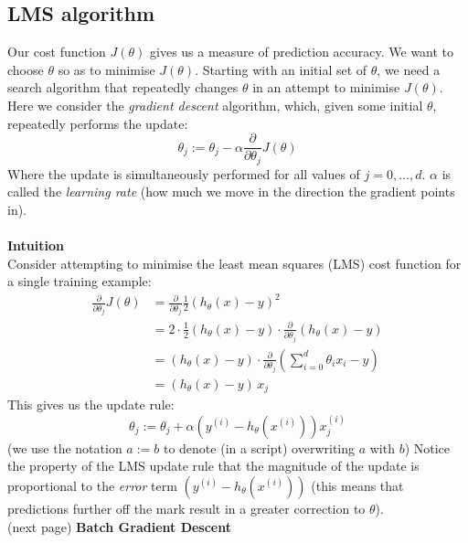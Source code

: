 \documentclass{report}
\begin{document}
\subsection{LMS algorithm}
Our cost function $J(\theta)$ gives us a measure of prediction accuracy. We want to choose $\theta$ so as to
minimise $J(\theta)$. Starting with an initial set of $\theta$, we need a search algorithm that
repeatedly changes $\theta$ in an attempt to minimise $J(\theta)$. Here we consider the \textit{gradient descent}
algorithm, which, given some initial $\theta$, repeatedly performs the update:
\begin{equation*}
\theta_j:=\theta_j-\alpha\frac{\partial}{\partial\theta_j}J(\theta)
\end{equation*}
Where the update is simultaneously performed for all values of $j=0,\ldots,d$. $\alpha$ is called the 
\textit{learning rate}
(how much we move in the direction the gradient points in).\\
\vspace{1mm}\\
\textbf{Intuition}\\
Consider attempting to minimise the least mean squares (LMS) cost function for a single training example:
\begin{align*}
\frac{\partial}{\partial\theta_j}J(\theta)&=\frac{\partial}{\partial\theta_j}\frac{1}{2}(h_\theta(x)-y)^2\\
&=2\cdot\frac{1}{2}(h_\theta(x)-y)\cdot\frac{\partial}{\partial\theta_j}(h_\theta(x)-y)\\
&=(h_\theta(x)-y)\cdot\frac{\partial}{\partial\theta_j}\left(\sum^d_{i=0}\theta_ix_i-y\right)\\
&=(h_\theta(x)-y)\,x_j
\end{align*}
This gives us the update rule:
\begin{equation*}
\theta_j:=\theta_j+\alpha\left(y^{(i)}-h_\theta(x^{(i)})\right)x_j^{(i)}
\end{equation*}
(we use the notation $a:=b$ to denote (in a script) overwriting $a$ with $b$) Notice the property of the LMS update
rule that the magnitude of the update is proportional to the \textit{error} term 
$\left(y^{(i)}-h_\theta(x^{(i)})\right)$ (this means that predictions further off the mark result in a greater
correction to $\theta$).\\
(next page)
\newpage
\noindent\textbf{Batch Gradient Descent}\\
\end{document}
